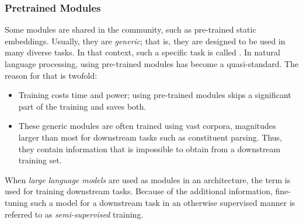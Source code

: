 \documentclass[../document.tex]{subfiles}
\begin{document}
    \subsubsection{Pretrained Modules}
    Some modules are shared in the community, such as pre-trained static embeddings.
    Usually, they are \emph{generic}; that is, they are designed to be used in many diverse tasks. In that context, such a specific task is called .
    In natural language processing, using pre-trained modules has become a quasi-standard.
    The reason for that is twofold:
    \begin{itemize}
        \item
            Training costs time and power; using pre-trained modules skips a significant part of the training and saves both.
        \item
            These generic modules are often trained using vast corpora, magnitudes larger than most for downstream tasks such as constituent parsing.
            Thus, they contain information that is impossible to obtain from a downstream training set.
    \end{itemize}
    When \emph{large language models} are used as modules in an architecture, the term  is used for training downstream tasks.
    Because of the additional information, fine-tuning such a model for a downstream task in an otherwise supervised manner is referred to as \emph{semi-supervised} training.
\end{document}
